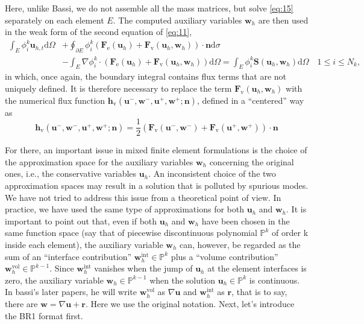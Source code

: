 \documentclass{develop-note}
\begin{document}
Here, unlike Bassi, we do not assemble all the mass matrices, but solve \autoref{eq:15} separately on each element $E$. The computed auxiliary variables $\mathbf{w}_{h}$ are then used in the weak form of the second equation of \autoref{eq:11},
\begin{equation}
  \label{eq:17}
  \begin{aligned}
    \int_{E}\phi_{i}^{k}\mathbf{u}_{h,t}\mathrm{d}\Omega &+\oint_{\partial E}\phi_{i}^{k}(\mathbf{F}_{\mathrm{e}}(\mathbf{u}_{h})+\mathbf{F}_{\mathrm{v}}(\mathbf{u}_{h},\mathbf{w}_{h}))\cdot\mathbf{n}\mathrm{d}\sigma\\
    &-\int_{E}\nabla\phi_{i}^{k}\cdot(\mathbf{F}_{\mathrm{e}}(\mathbf{u}_{h})+\mathbf{F}_{\mathrm{v}}(\mathbf{u}_{h},\mathbf{w}_{h}))\mathrm{d}\Omega=\int_{E}\phi_{i}^{k}\mathbf{S}(\mathbf{u}_{h},\mathbf{w}_{h})\mathrm{d}\Omega\quad 1\leqslant i\leqslant N_{k},
  \end{aligned}
\end{equation}
in which, once again, the boundary integral contains flux terms that are not uniquely defined. It is therefore necessary to replace the term $\mathbf{F}_{\mathrm{v}}(\mathbf{u}_{h},\mathbf{w}_{h})$ with the numerical flux function $\mathbf{h}_{\mathrm{v}}(\mathbf{u}^{-},\mathbf{w}^{-},\mathbf{u}^{+},\mathbf{w}^{+};\mathbf{n})$, defined in a ``centered'' way as
\begin{equation}
  \mathbf{h}_{\mathrm{v}}(\mathbf{u}^{-},\mathbf{w}^{-},\mathbf{u}^{+},\mathbf{w}^{+};\mathbf{n})=\dfrac{1}{2}(\mathbf{F}_{\mathrm{v}}(\mathbf{u}^{-},\mathbf{w}^{-})+\mathbf{F}_{\mathrm{v}}(\mathbf{u}^{+},\mathbf{w}^{+}))\cdot\mathbf{n}
\end{equation}

For there, an important issue in mixed finite element formulations is the choice of the approximation space for the auxiliary variables $\mathbf{w}_{h}$ concerning the original ones, i.e., the conservative variables $\mathbf{u}_{h}$. An inconsistent choice of the two approximation spaces may result in a solution that is polluted by spurious modes. We have not tried to address this issue from a theoretical point of view. In practice, we have used the same type of approximations for both $\mathbf{u}_{h}$ and $\mathbf{w}_{h}$. It is important to point out that, even if both $\mathbf{u}_{h}$ and $\mathbf{w}_{h}$ have been chosen in the same function space (say that of piecewise discontinuous polynomial $\mathbb{P}^{k}$ of order k inside each element), the auxiliary variable $\mathbf{w}_{h}$ can, however, be regarded as the sum of an ``interface contribution'' $\mathbf{w}_{h}^{\mathrm{int}}\in\mathbb{P}^{k}$ plus a ``volume contribution'' $\mathbf{w}_{h}^{\mathrm{vol}}\in\mathbb{P}^{k-1}$. Since $\mathbf{w}_{h}^{\mathrm{int}}$ vanishes when the jump of $\mathbf{u}_{h}$ at the element interfaces is zero, the auxiliary variable $\mathbf{w}_{h}\in\mathbb{P}^{k-1}$ when the solution $\mathbf{u}_{h}\in\mathbb{P}^{k}$ is continuous. In bassi's later papers, he will write $\mathbf{w}_{h}^{\mathrm{vol}}$ as $\nabla\mathbf{u}$ and $\mathbf{w}_{h}^{\mathrm{int}}$ as $\mathbf{r}$, that is to say, there are $\mathbf{w}=\nabla\mathbf{u}+\mathbf{r}$. Here we use the original notation. Next, let's introduce the BR1 format first.
\end{document}
